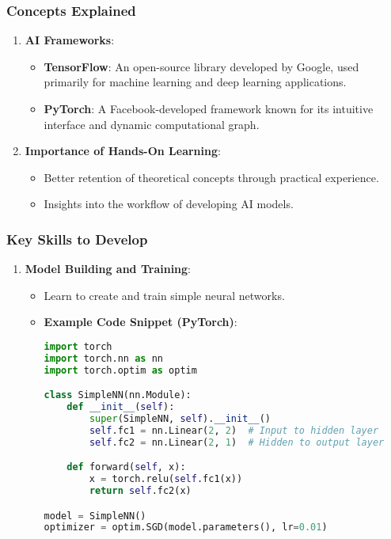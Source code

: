 \documentclass[aspectratio=169]{beamer}
\begin{document}
\begin{frame}
    \frametitle{Concepts Explained}
    \begin{enumerate}
        \item \textbf{AI Frameworks}:
        \begin{itemize}
            \item \textbf{TensorFlow}: An open-source library developed by Google, used primarily for machine learning and deep learning applications.
            \item \textbf{PyTorch}: A Facebook-developed framework known for its intuitive interface and dynamic computational graph.
        \end{itemize}
        
        \item \textbf{Importance of Hands-On Learning}:
        \begin{itemize}
            \item Better retention of theoretical concepts through practical experience.
            \item Insights into the workflow of developing AI models.
        \end{itemize}
    \end{enumerate}
\end{frame}

\begin{frame}[fragile]
    \frametitle{Key Skills to Develop}
    \begin{enumerate}
        \item \textbf{Model Building and Training}:
        \begin{itemize}
            \item Learn to create and train simple neural networks.
            \item \textbf{Example Code Snippet (PyTorch)}:
            \begin{lstlisting}[language=Python]
import torch
import torch.nn as nn
import torch.optim as optim

class SimpleNN(nn.Module):
    def __init__(self):
        super(SimpleNN, self).__init__()
        self.fc1 = nn.Linear(2, 2)  # Input to hidden layer
        self.fc2 = nn.Linear(2, 1)  # Hidden to output layer

    def forward(self, x):
        x = torch.relu(self.fc1(x))
        return self.fc2(x)

model = SimpleNN()
optimizer = optim.SGD(model.parameters(), lr=0.01)
            \end{lstlisting}
        \end{itemize}
    \end{enumerate}
\end{frame}
\end{document}
